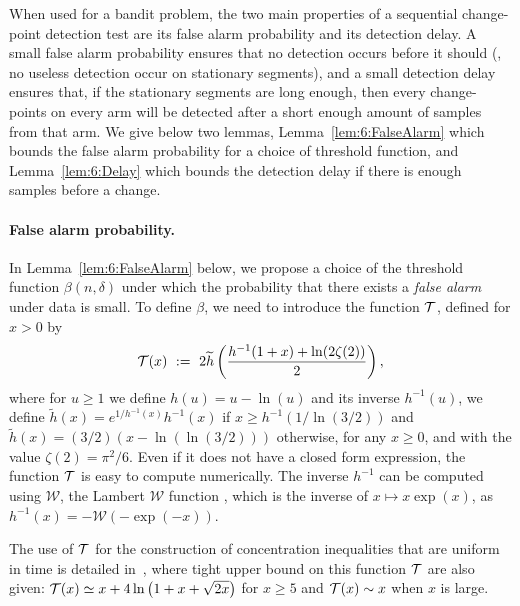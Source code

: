 When used for a bandit problem, the two main properties of a sequential change-point detection test are its false alarm probability and its detection delay.
%
A small false alarm probability ensures that no detection occurs before it should (\ie, no useless detection occur on stationary segments), and a small detection delay ensures that, if the stationary segments are long enough, then every change-points on every arm will be detected after a short enough amount of samples from that arm.
%
We give below two lemmas, Lemma~\ref{lem:6:FalseAlarm} which bounds the false alarm probability for a choice of threshold function, and Lemma~\ref{lem:6:Delay} which bounds the detection delay if there is enough samples before a change.


\paragraph{False alarm probability.}\label{par:6:falseAlarm}

In Lemma~\ref{lem:6:FalseAlarm} below, we propose a choice of the threshold function $\beta(n,\delta)$ under which the probability that there exists a \emph{false alarm} under \iid{} data is small. To define $\beta$, we need to introduce the function $\mathcal{T}$, defined for $x>0$ by
%
\begin{equation}\label{def:6:function_T}
    \mathcal{T}(x) ~:=~ 2 \widetilde{h}\left(\frac{h^{-1}(1+x) + \ln(2\zeta(2))}{2}\right),
\end{equation}
where for $u \ge 1$ we define $h(u) = u - \ln(u)$ and its inverse $h^{-1}(u)$,
%
we define $\widetilde{h}(x) = e^{1/h^{-1}(x)} h^{-1}(x)$ if $x \ge h^{-1}(1/\ln (3/2))$ and $\tilde{h}(x) = (3/2) (x-\ln(\ln (3/2)))$ otherwise, for any $x \ge 0$,
and with the value $\zeta(2) = \pi^2 / 6$.
%
Even if it does not have a closed form expression, the function $\mathcal{T}$ is easy to compute numerically.
%
The inverse $h^{-1}$ can be computed using $\mathcal{W}$, the Lambert $\mathcal{W}$ function \cite{Corless96}, which is the inverse of $x \mapsto x \exp(x)$, as $h^{-1}(x) = - \mathcal{W}(- \exp(-x))$.

The use of $\mathcal{T}$ for the construction of concentration inequalities that are uniform in time is detailed in~\cite{KK18Martingales}, where tight upper bound on this function $\mathcal{T}$ are also given:
$\mathcal{T} (x) \simeq x + 4 \ln\big(1 + x + \sqrt{2x}\big)$ for $x\geq 5$ and $\mathcal{T}(x) \sim x$ when $x$ is large.

